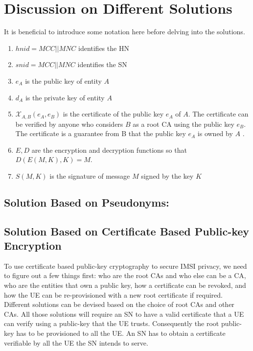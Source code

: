 \documentclass[runningheads,a4paper]{llncs} %
\begin{document}
\section{Discussion on Different Solutions}\label{sec:solutions} 
\label{sec:existing_solutions}
It is beneficial to introduce some notation here before delving into the solutions. 
\begin{enumerate}
\item $hnid=MCC||MNC$ identifies the HN
\item $snid=MCC||MNC$ identifies the SN
\item $e_A$ is the public key of entity $A$
\item $d_A$ is the private key of entity $A$ 
\item $\mathcal{X}_{A,B}(e_A,e_B)$ is the certificate of the public key $e_A$ of $A$. The certificate can be verified by anyone who considers $B$ as a root CA using the public key $e_B$. The certificate is a guarantee from B that the public key $e_A$ is owned by $A$ .
\item $E,D$ are the encryption and decryption functions so that $D(E(M,K),K) = M$.
\item $S(M,K)$ is the signature of message $M$ signed by the key $K$
\end{enumerate}

\subsection{Solution Based on Pseudonyms:}
\label{sec:pseudonyms}


\subsection{Solution Based on Certificate Based Public-key Encryption} 
\label{sub_sec:solution_certificate}
To use certificate based public-key cryptography to secure IMSI privacy, we need to figure out a few things first: who are the root CAs and who else can be a CA, who are the entities that own a public key, how a certificate can be revoked, and how the UE can be re-provisioned with a new root certificate if required. Different solutions can be devised based on the choice of root CAs and other CAs. All those solutions will require an SN to have a valid certificate that a UE can verify using a public-key that the UE trusts. Consequently the root public-key has to be provisioned to all the UE. An SN has to obtain a certificate verifiable by all the UE the SN intends to serve. 
\end{document}
